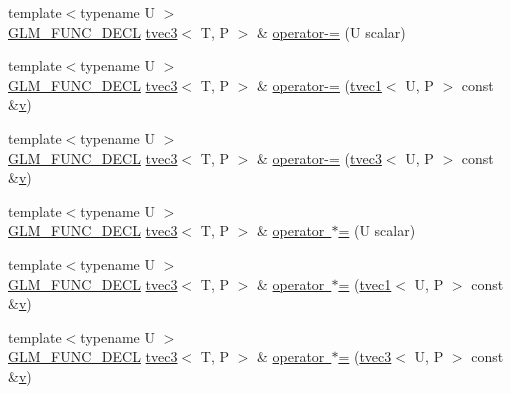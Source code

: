 \begin{DoxyCompactItemize}
\item 
{\footnotesize template$<$typename U $>$ }\\\mbox{\hyperlink{setup_8hpp_ab2d052de21a70539923e9bcbf6e83a51}{G\+L\+M\+\_\+\+F\+U\+N\+C\+\_\+\+D\+E\+CL}} \mbox{\hyperlink{structglm_1_1tvec3}{tvec3}}$<$ T, P $>$ \& \mbox{\hyperlink{structglm_1_1tvec3_adfb7d908bd3a5fe2e176a7e806008de6}{operator-\/=}} (U scalar)
\item 
{\footnotesize template$<$typename U $>$ }\\\mbox{\hyperlink{setup_8hpp_ab2d052de21a70539923e9bcbf6e83a51}{G\+L\+M\+\_\+\+F\+U\+N\+C\+\_\+\+D\+E\+CL}} \mbox{\hyperlink{structglm_1_1tvec3}{tvec3}}$<$ T, P $>$ \& \mbox{\hyperlink{structglm_1_1tvec3_a8ebee86f6ea622e744ecedaf7e7db9ff}{operator-\/=}} (\mbox{\hyperlink{structglm_1_1tvec1}{tvec1}}$<$ U, P $>$ const \&\mbox{\hyperlink{glad_8h_a14cfbe2fc2234f5504618905b69d1e06}{v}})
\item 
{\footnotesize template$<$typename U $>$ }\\\mbox{\hyperlink{setup_8hpp_ab2d052de21a70539923e9bcbf6e83a51}{G\+L\+M\+\_\+\+F\+U\+N\+C\+\_\+\+D\+E\+CL}} \mbox{\hyperlink{structglm_1_1tvec3}{tvec3}}$<$ T, P $>$ \& \mbox{\hyperlink{structglm_1_1tvec3_a356d8232f5a66a5e971ab1cb46593722}{operator-\/=}} (\mbox{\hyperlink{structglm_1_1tvec3}{tvec3}}$<$ U, P $>$ const \&\mbox{\hyperlink{glad_8h_a14cfbe2fc2234f5504618905b69d1e06}{v}})
\item 
{\footnotesize template$<$typename U $>$ }\\\mbox{\hyperlink{setup_8hpp_ab2d052de21a70539923e9bcbf6e83a51}{G\+L\+M\+\_\+\+F\+U\+N\+C\+\_\+\+D\+E\+CL}} \mbox{\hyperlink{structglm_1_1tvec3}{tvec3}}$<$ T, P $>$ \& \mbox{\hyperlink{structglm_1_1tvec3_a5c0fa7652a4d8c53b19421963a1c46b8}{operator $\ast$=}} (U scalar)
\item 
{\footnotesize template$<$typename U $>$ }\\\mbox{\hyperlink{setup_8hpp_ab2d052de21a70539923e9bcbf6e83a51}{G\+L\+M\+\_\+\+F\+U\+N\+C\+\_\+\+D\+E\+CL}} \mbox{\hyperlink{structglm_1_1tvec3}{tvec3}}$<$ T, P $>$ \& \mbox{\hyperlink{structglm_1_1tvec3_a03d502a00f0f580ebcc8d5ca66744f1c}{operator $\ast$=}} (\mbox{\hyperlink{structglm_1_1tvec1}{tvec1}}$<$ U, P $>$ const \&\mbox{\hyperlink{glad_8h_a14cfbe2fc2234f5504618905b69d1e06}{v}})
\item 
{\footnotesize template$<$typename U $>$ }\\\mbox{\hyperlink{setup_8hpp_ab2d052de21a70539923e9bcbf6e83a51}{G\+L\+M\+\_\+\+F\+U\+N\+C\+\_\+\+D\+E\+CL}} \mbox{\hyperlink{structglm_1_1tvec3}{tvec3}}$<$ T, P $>$ \& \mbox{\hyperlink{structglm_1_1tvec3_ab12c639e59e0055e3aa376d009e8cccf}{operator $\ast$=}} (\mbox{\hyperlink{structglm_1_1tvec3}{tvec3}}$<$ U, P $>$ const \&\mbox{\hyperlink{glad_8h_a14cfbe2fc2234f5504618905b69d1e06}{v}})

\end{DoxyCompactItemize}
